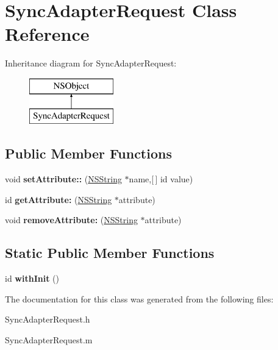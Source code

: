 \hypertarget{interface_sync_adapter_request}{
\section{\-Sync\-Adapter\-Request \-Class \-Reference}
\label{interface_sync_adapter_request}
}
\-Inheritance diagram for \-Sync\-Adapter\-Request\-:\begin{figure}[H]
\begin{center}
\leavevmode
\includegraphics[height=2.000000cm]{interface_sync_adapter_request}
\end{center}
\end{figure}
\subsection*{\-Public \-Member \-Functions}
\begin{DoxyCompactItemize}
\item 
\hypertarget{interface_sync_adapter_request_aa1abcd1d84cce70fe42285ddee4ec8f3}{
void {\bfseries set\-Attribute\-::} (\hyperlink{class_n_s_string}{\-N\-S\-String} $\ast$name,\mbox{[}$\,$\mbox{]} id value)}
\label{interface_sync_adapter_request_aa1abcd1d84cce70fe42285ddee4ec8f3}

\item 
\hypertarget{interface_sync_adapter_request_a7dc21feb37a4e18d2794911bf81c257c}{
id {\bfseries get\-Attribute\-:} (\hyperlink{class_n_s_string}{\-N\-S\-String} $\ast$attribute)}
\label{interface_sync_adapter_request_a7dc21feb37a4e18d2794911bf81c257c}

\item 
\hypertarget{interface_sync_adapter_request_a60b3bdee9971c8827e620f28c0c9bc14}{
void {\bfseries remove\-Attribute\-:} (\hyperlink{class_n_s_string}{\-N\-S\-String} $\ast$attribute)}
\label{interface_sync_adapter_request_a60b3bdee9971c8827e620f28c0c9bc14}

\end{DoxyCompactItemize}
\subsection*{\-Static \-Public \-Member \-Functions}
\begin{DoxyCompactItemize}
\item 
\hypertarget{interface_sync_adapter_request_afd2c27aa1f198dce37a0389584f67c65}{
id {\bfseries with\-Init} ()}
\label{interface_sync_adapter_request_afd2c27aa1f198dce37a0389584f67c65}

\end{DoxyCompactItemize}


\-The documentation for this class was generated from the following files\-:\begin{DoxyCompactItemize}
\item 
\-Sync\-Adapter\-Request.\-h\item 
\-Sync\-Adapter\-Request.\-m\end{DoxyCompactItemize}
